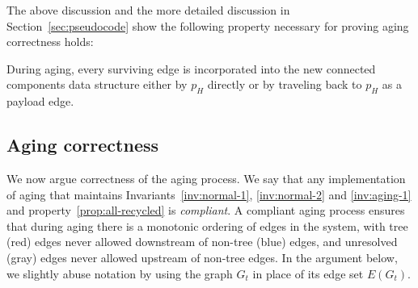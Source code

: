 The above discussion and the more detailed discussion in Section~\ref{sec:pseudocode} show the following property necessary for proving aging correctness holds:
\begin{property}
\label{prop:all-recycled}
During aging, every surviving edge is incorporated into the new 
connected components data structure either by $p_H$ directly or 
by traveling back to $p_H$ as a payload edge.
\end{property}

\subsection{Aging correctness}
We now argue correctness of the aging process.
We say that any implementation of \XSCC aging that maintains
Invariants~\ref{inv:normal-1}, \ref{inv:normal-2} and \ref{inv:aging-1} and property~\ref{prop:all-recycled} is \emph{compliant}.
A compliant aging process ensures that during aging there is a monotonic ordering of
edges in the system, with tree (red) edges never allowed downstream of
non-tree (blue) edges, and unresolved (gray) edges never allowed upstream
of non-tree edges. In the argument below, we slightly abuse notation by
using the graph $G_t$ in place of its edge set $E(G_t)$.


